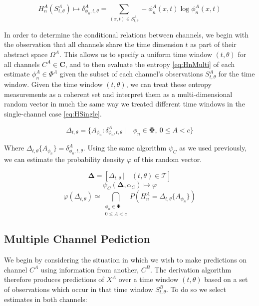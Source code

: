 \documentclass[10pt]{article}
\begin{document}
\begin{equation} \label{eq:HnMulti} H_n^A( S_{t,\theta}^A ) \mapsto \delta_{\phi_n,t,\theta}^A = \sum_{(x,t) \in S_{t,\theta}^A } -\phi_n^A(x,t) \log \phi_n^A(x,t) \end{equation}

In order to determine the conditional relations between channels, we begin with the observation that all channels share the time dimension \(t \) as part of their abstract space \(\Omega^A \).  This allows us to specify a uniform time window \((t,\theta) \) for all channels \(C^A \in \mathbf{C} \), and to then evaluate the entropy \ref{eq:HnMulti} of each estimate \(\phi_n^A \in \Phi^A \) given the subset of each channel's observations \(S_{t,\theta}^A \) for the time window.  Given the time window \((t,\theta) \), we can treat these entropy measurements as a coherent set and interpret them as a multi-dimensional random vector in much the same way we treated different time windows in the single-channel case \ref{eq:HSingle}.

\[
\Delta_{t,\theta} = \{ A_{\phi_n} : \delta_{\phi_n,t,\theta}^A \ | \quad \phi_n \in \boldsymbol{\Phi}, \ 0 \le A < c \}
\]

Where \( \Delta_{t,\theta} \{ A_\phi_n \} = \delta_{\phi_n,t,\theta}^A \). Using the same algorithm \(\psi_C \) as we used previously, we can estimate the probability density \(\varphi \) of this random vector. 

\[ \boldsymbol{\Delta} = [ \Delta_{t,\theta} \ | \quad (t,\theta) \in \mathcal{T} ] \]
\begin{equation} \psi_C( \boldsymbol{\Delta} , \alpha_C ) \mapsto \varphi \end{equation}
\[ \varphi( \Delta_{t,\theta} ) \simeq \bigcap_{\substack{ \phi_n \in \boldsymbol{\Phi} \\ 0 \le A < c }} P( H_n^A = \Delta_{t,\theta}\{A_{\phi_n} \} ) \]

\subsection{Multiple Channel Pediction}
We begin by considering the situation in which we wish to make predictions on channel \(C^A \) using information from another, \(C^B \).  The derivation algorithm therefore produces predictions of \(X^A \) over a time window \((t,\theta) \) based on a set of observations which occur in that time window \(S_{t,\theta}^B \).  To do so we select estimates in both channels:
\end{document}
